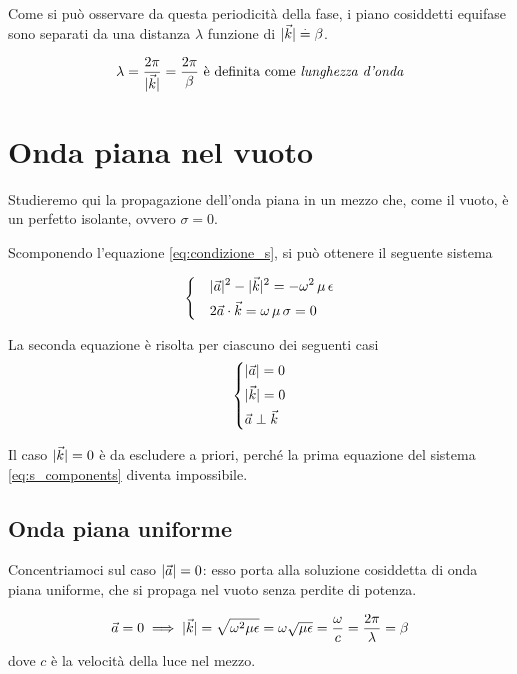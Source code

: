 \begin{itemize}
		Come si può osservare da questa periodicità della fase, i piano cosiddetti equifase sono separati da una distanza $\lambda$ funzione di $|\vec{k}| \stackrel{.}{=} \beta$.

		\begin{equation} \label{eq:lunghezza_donda}
			\lambda = \frac{2 \pi}{|\vec{k}|} = \frac{2 \pi}{\beta} \text{ è definita come \emph{lunghezza d'onda}}
		\end{equation}
	\end{itemize}

\section{Onda piana nel vuoto}
	Studieremo qui la propagazione dell'onda piana in un mezzo che, come il vuoto, è un perfetto isolante, ovvero $\sigma = 0$.

	Scomponendo l'equazione \eqref{eq:condizione_s}, si può ottenere il seguente sistema

	\begin{equation} \label{eq:s_components}
		\begin{dcases}
			& |\vec{a}|^2 - |\vec{k}|^2 = - \omega^2 \, \mu \, \epsilon \\
			& 2 \vec{a} \cdot \vec{k} = \omega \, \mu \, \sigma = 0
		\end{dcases}
	\end{equation}

	La seconda equazione è risolta per ciascuno dei seguenti casi
	\begin{equation}\begin{dcases}
		|\vec{a}| = 0 \\
		|\vec{k}| = 0 \\
		\vec{a} \perp \vec{k}
	\end{dcases}\end{equation}

	Il caso $|\vec{k}| = 0$ è da escludere a priori, perché la prima equazione del sistema \eqref{eq:s_components} diventa impossibile.

	\subsection{Onda piana uniforme}
		Concentriamoci sul caso $|\vec{a}| = 0$: esso porta alla soluzione cosiddetta di onda piana uniforme, che si propaga nel vuoto senza perdite di potenza.

		\begin{equation*}
				\vec{a} = 0 \implies |\vec{k}| = \sqrt{\omega^2 \mu \epsilon} = \omega \sqrt{\mu \epsilon} = \frac{\omega}{c} = \frac{2 \pi}{\lambda} = \beta
		\end{equation*}
		dove $c$ è la velocità della luce nel mezzo.

